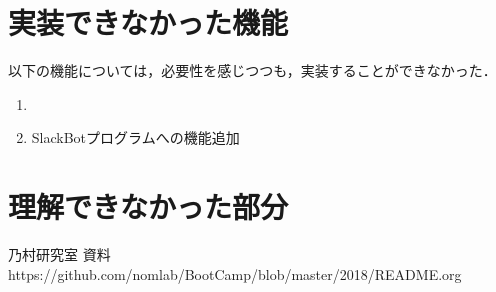 \documentclass[12pt]{jsarticle}
\begin{document}
\section{実装できなかった機能}
以下の機能については，必要性を感じつつも，実装することができなかった．
\begin{enumerate}
\item 
\item SlackBotプログラムへの機能追加\\
\end{enumerate}
\section{理解できなかった部分}


\begin{thebibliography}{1}
   乃村研究室 資料　https:\slash{}\slash{}github.com\slash{}nomlab\slash{}BootCamp\slash{}blob\slash{}master\slash{}2018\slash{}README.org
\end{thebibliography}

%
%
\end{document}

